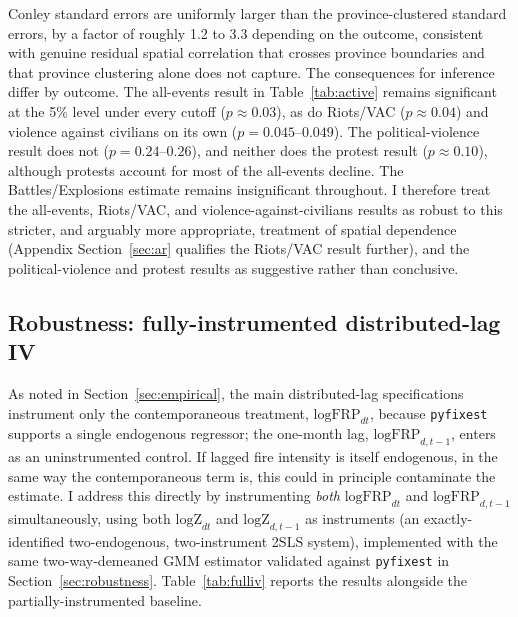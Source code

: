 \documentclass[12pt]{article}
\begin{document}
Conley standard errors are uniformly larger than the province-clustered standard errors, by a factor of roughly 1.2 to 3.3 depending on the outcome, consistent with genuine residual spatial correlation that crosses province boundaries and that province clustering alone does not capture. The consequences for inference differ by outcome. The all-events result in Table~\ref{tab:active} remains significant at the 5\% level under every cutoff ($p \approx 0.03$), as do Riots/VAC ($p \approx 0.04$) and violence against civilians on its own ($p=0.045$--$0.049$). The political-violence result does not ($p=0.24$--$0.26$), and neither does the protest result ($p \approx 0.10$), although protests account for most of the all-events decline. The Battles/Explosions estimate remains insignificant throughout. I therefore treat the all-events, Riots/VAC, and violence-against-civilians results as robust to this stricter, and arguably more appropriate, treatment of spatial dependence (Appendix Section~\ref{sec:ar} qualifies the Riots/VAC result further), and the political-violence and protest results as suggestive rather than conclusive.

\subsection{Robustness: fully-instrumented distributed-lag IV}
\label{sec:fulliv}

As noted in Section~\ref{sec:empirical}, the main distributed-lag specifications instrument only the contemporaneous treatment, $\text{logFRP}_{dt}$, because \texttt{pyfixest} supports a single endogenous regressor; the one-month lag, $\text{logFRP}_{d,t-1}$, enters as an uninstrumented control. If lagged fire intensity is itself endogenous, in the same way the contemporaneous term is, this could in principle contaminate the estimate. I address this directly by instrumenting \emph{both} $\text{logFRP}_{dt}$ and $\text{logFRP}_{d,t-1}$ simultaneously, using both $\text{logZ}_{dt}$ and $\text{logZ}_{d,t-1}$ as instruments (an exactly-identified two-endogenous, two-instrument 2SLS system), implemented with the same two-way-demeaned GMM estimator validated against \texttt{pyfixest} in Section~\ref{sec:robustness}. Table~\ref{tab:fulliv} reports the results alongside the partially-instrumented baseline.
\end{document}

